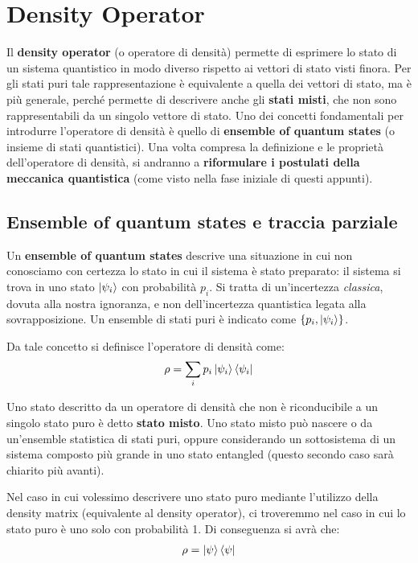 \section{Density Operator}
Il \textbf{density operator} (o operatore di densità) permette di esprimere lo stato di un sistema quantistico in modo diverso rispetto ai vettori di stato visti finora. Per gli stati puri tale rappresentazione è equivalente a quella dei vettori di stato, ma è più generale, perché permette di
descrivere anche gli \textbf{stati misti}, che non sono rappresentabili da un singolo vettore di stato. Uno dei concetti fondamentali per introdurre l'operatore di densità è quello di \textbf{ensemble of quantum states} (o insieme di stati quantistici). Una volta compresa la definizione e le proprietà dell'operatore di densità, si andranno a \textbf{riformulare i postulati della meccanica quantistica} (come visto nella fase iniziale di
questi appunti).

\subsection{Ensemble of quantum states e traccia parziale}
Un \textbf{ensemble of quantum states} descrive una situazione in cui non conosciamo con certezza lo stato in cui il sistema è stato preparato: il sistema si trova in uno stato \(\ket{\psi_i}\) con probabilità \(p_i\). Si tratta di un'incertezza \emph{classica}, dovuta alla nostra ignoranza, e non dell'incertezza quantistica legata alla sovrapposizione. Un ensemble di stati puri è indicato come \(\{p_i, \ket{\psi_i}\}\).

Da tale concetto si definisce l'operatore di densità come:
\begin{gather*}
\rho = \sum_i p_i \ket{\psi_i}\bra{\psi_i}
\end{gather*}

Uno stato descritto da un operatore di densità che non è riconducibile a un singolo stato puro è detto \textbf{stato misto}. Uno stato misto può nascere o da un'ensemble statistica di stati puri, oppure considerando un sottosistema di un sistema composto più grande in uno stato entangled (questo secondo caso sarà chiarito più avanti).

Nel caso in cui volessimo descrivere uno stato puro mediante l'utilizzo della density matrix (equivalente al density operator), ci troveremmo nel caso in cui lo stato puro è uno solo con probabilità 1. Di conseguenza si avrà che:
\begin{gather*}
\rho = \ket{\psi}\bra{\psi}
\end{gather*}

